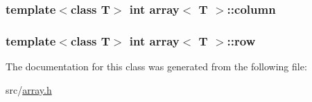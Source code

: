 \subsubsection[{column}]{\setlength{\rightskip}{0pt plus 5cm}template$<$class T$>$ int {\bf array}$<$ T $>$\+::column\hspace{0.3cm}{\ttfamily [private]}}\label{classarray_a0722d2ae3a709aa8abadac67a3c0b003}
\hypertarget{classarray_a7c38a7c022fd545cbb1d4ff62522a231}{}
\subsubsection[{row}]{\setlength{\rightskip}{0pt plus 5cm}template$<$class T$>$ int {\bf array}$<$ T $>$\+::row\hspace{0.3cm}{\ttfamily [private]}}\label{classarray_a7c38a7c022fd545cbb1d4ff62522a231}


The documentation for this class was generated from the following file\+:\begin{DoxyCompactItemize}
\item 
src/\hyperlink{array_8h}{array.\+h}\end{DoxyCompactItemize}
